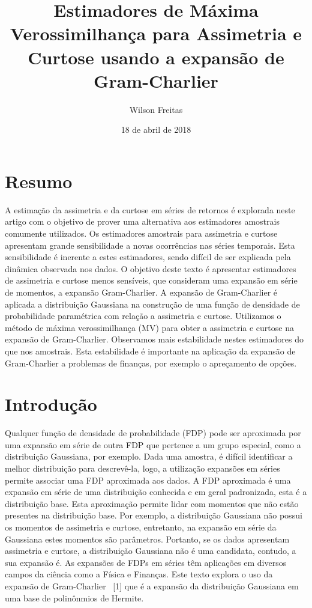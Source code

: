 \documentclass[]{article}
\title{Estimadores de Máxima Verossimilhança para Assimetria e Curtose usando a
expansão de Gram-Charlier}
\author{Wilson Freitas}
\date{18 de abril de 2018}
\begin{document}
\maketitle

\section{Resumo}\label{resumo}

A estimação da assimetria e da curtose em séries de retornos é explorada
neste artigo com o objetivo de prover uma alternativa aos estimadores
amostrais comumente utilizados. Os estimadores amostrais para assimetria
e curtose apresentam grande sensibilidade a novas ocorrências nas séries
temporais. Esta sensibilidade é inerente a estes estimadores, sendo
difícil de ser explicada pela dinâmica observada nos dados. O objetivo
deste texto é apresentar estimadores de assimetria e curtose menos
sensíveis, que consideram uma expansão em série de momentos, a expansão
Gram-Charlier. A expansão de Gram-Charlier é aplicada a distribuição
Gaussiana na construção de uma função de densidade de probabilidade
paramétrica com relação a assimetria e curtose. Utilizamos o método de
máxima verossimilhança (MV) para obter a assimetria e curtose na
expansão de Gram-Charlier. Observamos mais estabilidade nestes
estimadores do que nos amostrais. Esta estabilidade é importante na
aplicação da expansão de Gram-Charlier a problemas de finanças, por
exemplo o apreçamento de opções.

\section{Introdução}\label{introducao}

Qualquer função de densidade de probabilidade (FDP) pode ser aproximada
por uma expansão em série de outra FDP que pertence a um grupo especial,
como a distribuição Gaussiana, por exemplo. Dada uma amostra, é difícil
identificar a melhor distribuição para descrevê-la, logo, a utilização
expansões em séries permite associar uma FDP aproximada aos dados. A FDP
aproximada é uma expansão em série de uma distribuição conhecida e em
geral padronizada, esta é a distribuição base. Esta aproximação permite
lidar com momentos que não estão presentes na distribuição base. Por
exemplo, a distribuição Gaussiana não possui os momentos de assimetria e
curtose, entretanto, na expansão em série da Gaussiana estes momentos
são parâmetros. Portanto, se os dados apresentam assimetria e curtose, a
distribuição Gaussiana não é uma candidata, contudo, a sua expansão é.
As expansões de FDPs em séries têm aplicações em diversos campos da
ciência como a Física e Finanças. Este texto explora o uso da expansão
de Gram-Charlier ~{[}1{]} que é a expansão da distribuição Gaussiana em
uma base de polinônmios de Hermite.
\end{document}
